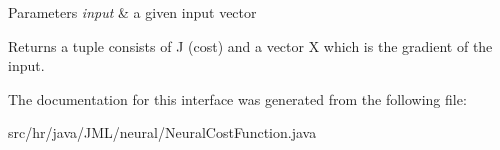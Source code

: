 \begin{DoxyParams}{Parameters}
{\em input} & a given input vector \\
\hline
\end{DoxyParams}
\begin{DoxyReturn}{Returns}
a tuple consists of J (cost) and a vector X which is the gradient of the input. 
\end{DoxyReturn}


The documentation for this interface was generated from the following file\+:\begin{DoxyCompactItemize}
\item 
src/hr/java/\+J\+M\+L/neural/Neural\+Cost\+Function.\+java\end{DoxyCompactItemize}
